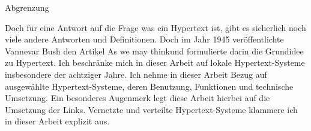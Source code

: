 \begin{section}{Abgrenzung}
\label{sec:abgrenzung}

Doch für eine Antwort auf die Frage was ein Hypertext ist, gibt es sicherlich noch viele andere Antworten und Definitionen. Doch im Jahr 1945 veröffentlichte Vannevar Bush den Artikel \glqq As we may think\grqq{ }und formulierte darin die Grundidee zu Hypertext. Ich beschränke mich in dieser Arbeit auf lokale Hypertext-Systeme insbesondere der achtziger Jahre. Ich nehme in dieser Arbeit Bezug auf ausgewählte Hypertext-Systeme, deren Benutzung, Funktionen und technische Umsetzung. Ein besonderes Augenmerk legt diese Arbeit hierbei auf die Umsetzung der Links. Vernetzte und verteilte Hypertext-Systeme klammere ich in dieser Arbeit explizit aus.

\end{section}